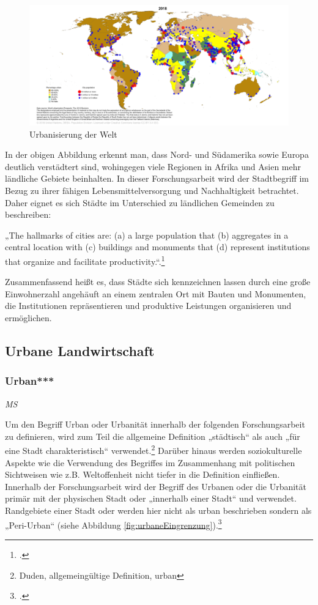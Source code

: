 \documentclass{scrartcl}
\begin{document}
\begin{figure}[htbp]
\centering
\hspace*{-3cm}   
\includegraphics[width=20cm]{image_folder/CityPop_Urban.png}
\caption{Urbanisierung der Welt}
\label{figUrban}
\end{figure}

\FloatBarrier
In der obigen Abbildung erkennt man, dass Nord- und Südamerika sowie Europa deutlich verstädtert sind, wohingegen viele Regionen in Afrika und Asien mehr ländliche Gebiete beinhalten. In dieser Forschungsarbeit wird der Stadtbegriff im Bezug zu ihrer fähigen Lebensmittelversorgung und Nachhaltigkeit betrachtet. Daher eignet es sich Städte im Unterschied zu ländlichen Gemeinden zu beschreiben: 

\begin{displayquote} 
„The hallmarks of cities are: (a) a large population that (b) aggregates in a central location with (c) buildings and monuments that (d) represent institutions that organize and facilitate productivity.“.\footcite[S.16]{Elmqvist2013} 
\end{displayquote}  
Zusammenfassend heißt es, dass Städte sich kennzeichnen lassen durch eine große Einwohnerzahl angehäuft an einem zentralen Ort mit Bauten und Monumenten, die Institutionen repräsentieren und produktive Leistungen organisieren und ermöglichen.

\subsection{Urbane Landwirtschaft}

\subsubsection{Urban***}
\begin{flushright}
\textit{MS}
\end{flushright}
Um den Begriff Urban oder Urbanität innerhalb der folgenden Forschungsarbeit zu definieren, wird zum Teil die allgemeine Definition „städtisch“ als auch „für eine Stadt charakteristisch“ verwendet.\footnote{Duden, allgemeingültige Definition, urban} Darüber hinaus werden soziokulturelle Aspekte wie die Verwendung des Begriffes im Zusammenhang mit politischen Sichtweisen wie z.B. Weltoffenheit nicht tiefer in die Definition einfließen. Innerhalb der Forschungsarbeit wird der Begriff des Urbanen oder die Urbanität primär mit der physischen Stadt oder „innerhalb einer Stadt“ und verwendet. Randgebiete einer Stadt oder werden hier nicht als urban beschrieben sondern als „Peri-Urban“ (siehe Abbildung \ref{fig:urbaneEingrenzung}).\footcite[S. 140]{MullerUrbanStadt}
\end{document}
